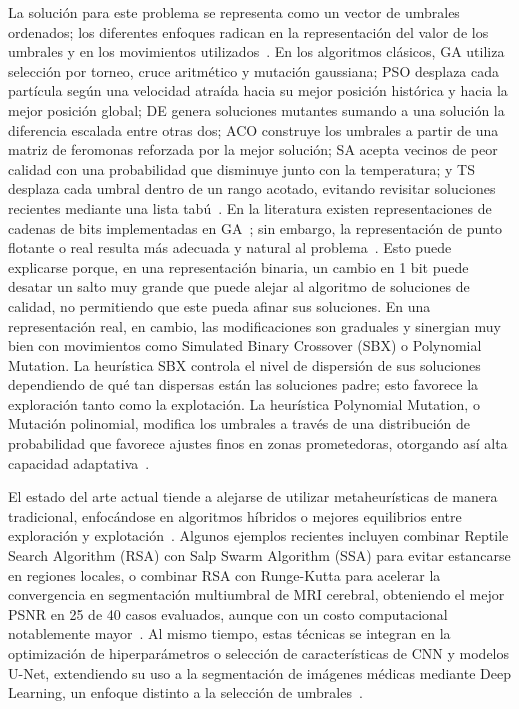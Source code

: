 \documentclass[letter, 10pt]{article}
\begin{document}
La soluci\'on para este problema se representa como un vector de umbrales ordenados; los diferentes enfoques radican en la representaci\'on del valor de los umbrales y en los movimientos utilizados~\cite{Hammouche2010Comparative, Manikandan2014Multilevel}.
En los algoritmos cl\'asicos, GA utiliza selecci\'on por torneo, cruce aritm\'etico y mutaci\'on gaussiana; PSO desplaza cada part\'icula seg\'un una velocidad atra\'ida hacia su mejor posici\'on hist\'orica y hacia la mejor posici\'on global;
DE genera soluciones mutantes sumando a una soluci\'on la diferencia escalada entre otras dos; ACO construye los umbrales a partir de una matriz de feromonas reforzada por la mejor soluci\'on;
SA acepta vecinos de peor calidad con una probabilidad que disminuye junto con la temperatura; y TS desplaza cada umbral dentro de un rango acotado, evitando revisitar soluciones recientes mediante una lista tab\'u~\cite{Hammouche2010Comparative}.
En la literatura existen representaciones de cadenas de bits implementadas en GA~\cite{Hammouche2010Comparative}; sin embargo, la representaci\'on de punto flotante o real resulta m\'as adecuada y natural al problema~\cite{Manikandan2014Multilevel}.
Esto puede explicarse porque, en una representaci\'on binaria, un cambio en 1 bit puede desatar un salto muy grande que puede alejar al algoritmo de soluciones de calidad, no permitiendo que este pueda afinar sus soluciones.
En una representaci\'on real, en cambio, las modificaciones son graduales y sinergian muy bien con movimientos como Simulated Binary Crossover (SBX) o Polynomial Mutation.
La heur\'istica SBX controla el nivel de dispersi\'on de sus soluciones dependiendo de qu\'e tan dispersas est\'an las soluciones padre; esto favorece la exploraci\'on tanto como la explotaci\'on.
La heur\'istica Polynomial Mutation, o Mutaci\'on polinomial, modifica los umbrales a trav\'es de una distribuci\'on de probabilidad que favorece ajustes finos en zonas prometedoras, otorgando as\'i alta capacidad adaptativa~\cite{Manikandan2014Multilevel}.

El estado del arte actual tiende a alejarse de utilizar metaheur\'isticas de manera tradicional, enfoc\'andose en algoritmos h\'ibridos o mejores equilibrios entre exploraci\'on y explotaci\'on~\cite{Lameesa2024Role}.
Algunos ejemplos recientes incluyen combinar Reptile Search Algorithm (RSA) con Salp Swarm Algorithm (SSA) para evitar estancarse en regiones locales,
o combinar RSA con Runge-Kutta para acelerar la convergencia en segmentaci\'on multiumbral de MRI cerebral, obteniendo el mejor PSNR en 25 de 40 casos evaluados, aunque con un costo computacional notablemente mayor~\cite{Lameesa2024Role}.
Al mismo tiempo, estas t\'ecnicas se integran en la optimizaci\'on de hiperpar\'ametros o selecci\'on de caracter\'isticas de CNN y modelos U-Net,
extendiendo su uso a la segmentaci\'on de im\'agenes m\'edicas mediante Deep Learning, un enfoque distinto a la selecci\'on de umbrales~\cite{Lameesa2024Role}.
\end{document}
